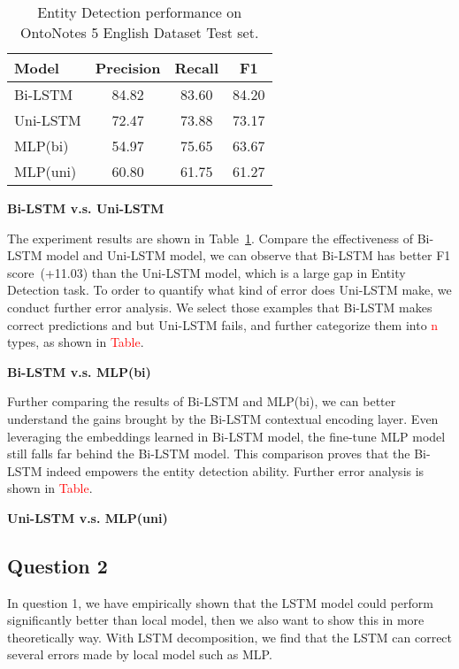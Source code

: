 \documentclass{article}
\newcommand{\red}[1]{\textcolor{red}{#1}}
\begin{document}
\begin{table}[t]
	\centering
	\begin{tabular}{l@{\qquad}ccc}
		\toprule
		\textbf{Model}         & \textbf{Precision} & \textbf{Recall} & \textbf{F1} \\ \midrule
		Bi-LSTM &  84.82 & 83.60  & 84.20 \\
		Uni-LSTM & 72.47 & 73.88 & 73.17 \\
		MLP(bi) & 54.97 & 75.65 & 63.67 \\ 
		MLP(uni) & 60.80 & 61.75 &  61.27 \\ 
		\bottomrule
	\end{tabular}
	\vspace{3mm}
	\caption{Entity Detection performance on OntoNotes 5 English Dataset Test set.}
	\label{res:ner}
\end{table}


\noindent \textbf{Bi-LSTM v.s. Uni-LSTM}


The experiment results are shown in Table~\ref{res:ner}. Compare the effectiveness of Bi-LSTM model and Uni-LSTM model, we can observe that Bi-LSTM has better F1 score~(+11.03) than the Uni-LSTM model, which is a large gap in Entity Detection task. To order to quantify what kind of error does Uni-LSTM make, we conduct further error analysis. We select those examples that Bi-LSTM makes correct predictions and but Uni-LSTM fails, and further categorize them into \red{n} types, as shown in \red{Table}.



\noindent \textbf{Bi-LSTM v.s. MLP(bi)}

Further comparing the results of Bi-LSTM and MLP(bi), we can better understand the gains brought by the Bi-LSTM contextual encoding layer. Even leveraging the embeddings learned in Bi-LSTM model, the fine-tune MLP model still falls far behind the Bi-LSTM model. This comparison proves that the Bi-LSTM indeed empowers the entity detection ability. Further error analysis is shown in \red{Table}.


\noindent \textbf{Uni-LSTM v.s. MLP(uni)}





\subsection{Question 2}

In question 1, we have empirically shown that the LSTM model could perform significantly better than local model, then we also want to show this in more theoretically way. With LSTM decomposition, we find that the LSTM can correct several errors made by local model such as MLP. 
\end{document}
